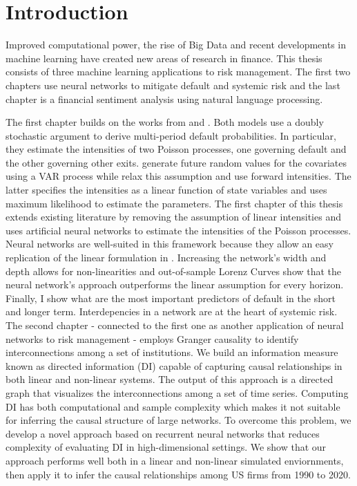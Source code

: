 \cleardoublepage
\chapter*{Introduction}

Improved computational power, the rise of Big Data and recent developments in machine learning have created new areas of research in finance. This thesis consists of three machine learning applications to risk management. The first two chapters use neural networks to mitigate default and systemic risk and the last chapter is a financial sentiment analysis using natural language processing.  

The first chapter builds on the works from \citet{DSW} and \citet{Duan2012}. Both models use a doubly stochastic argument to derive multi-period default probabilities. In particular, they estimate the intensities of two Poisson processes, one governing default and the other governing other exits. \citet{DSW} generate future random values for the covariates using a VAR process while \citet{Duan2012} relax this assumption and use forward intensities. The latter specifies the intensities as a linear function of state variables and uses maximum likelihood to estimate the parameters. The first chapter of this thesis extends existing literature by removing the assumption of linear intensities and uses artificial neural networks to estimate the intensities of the Poisson processes. Neural networks are well-suited in this framework because they allow an easy replication of the linear formulation in \citet{Duan2012}. Increasing the network's width and depth allows for non-linearities and out-of-sample Lorenz Curves show that the neural network's approach outperforms the linear assumption for every horizon. Finally, I show what are the most important predictors of default in the short and longer term. Interdepencies in a network are at the heart of systemic risk. The second chapter - connected to the first one as another application of neural networks to risk management - employs Granger causality to identify interconnections among a set of institutions. We build an information measure known as directed information (DI) capable of capturing causal relationships in both linear and non-linear systems. The output of this approach is a directed graph that visualizes the interconnections among a set of time series. Computing DI has both computational and sample complexity which makes it not suitable for inferring the causal structure of large networks. To overcome this problem, we develop a novel approach based on recurrent neural networks that reduces complexity of evaluating DI in high-dimensional settings. We show that our approach performs well both in a linear and non-linear simulated enviornments, then apply it to infer the causal relationships among US firms from 1990 to 2020. \\

